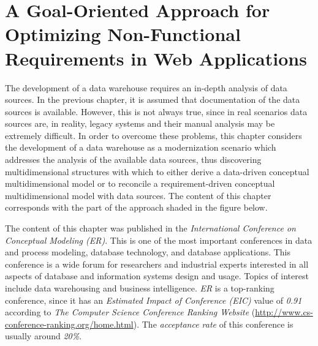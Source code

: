 %
%
%



\chapter{A Goal-Oriented Approach for Optimizing Non-Functional Requirements in Web Applications}
\label{c6} %

The development of a data warehouse requires an in-depth analysis of
data sources. In the previous chapter, it is assumed that
documentation of the data sources is available. However, this is not
always true, since in real scenarios data sources are, in reality,
legacy systems and their manual analysis may be extremely difficult.
In order to overcome these problems, this chapter considers the
development of a data warehouse as a modernization scenario which
addresses the analysis of the available data sources, thus
discovering multidimensional structures with which to either derive
a data-driven conceptual multidimensional model or to reconcile a
requirement-driven conceptual multidimensional model with data
sources. The content of this chapter corresponds with the part of
the approach shaded in the figure below.



The content of this chapter was published in the \emph{International
Conference on Conceptual Modeling (ER)}. This is one of the  most
important conferences in data and process modeling, database
technology, and database applications. This conference is a wide
forum for researchers and industrial experts interested in all
aspects of database and information systems design and usage. Topics
of interest include data warehousing and business intelligence.
\emph{ER} is a top-ranking conference, since it has an
\emph{Estimated Impact of Conference (EIC)} value of \emph{0.91}
according to \emph{The Computer Science Conference Ranking Website}
(\url{http://www.cs-conference-ranking.org/home.html}). The
\emph{acceptance rate} of this conference is usually around
\emph{20\%}.



%
